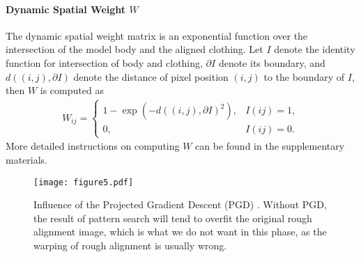 \documentclass[10pt,twocolumn,letterpaper]{article}
\begin{document}
\paragraph{Dynamic Spatial Weight $W$} The dynamic spatial weight matrix is an exponential function over the intersection of the model body and the aligned clothing. Let $I$ denote the identity function for intersection of body and clothing, $\partial I$ denote its boundary, and $d((i,j),\partial I)$ denote the distance of pixel position $(i,j)$ to the boundary of $I$, then $W$ is computed as \begin{gather}
    W_{ij}=\left\{\begin{array}{ll}
     1-\exp(-d((i,j),\partial I)^2),& I(ij)=1, \\
     0,& I(ij)=0.
\end{array}\right.\end{gather}
More detailed instructions on computing $W$ can be found in the supplementary materials.



\begin{figure}[t]
  \centering
  \texttt{[image: figure5.pdf]}\caption{Influence of the Projected Gradient Descent (PGD) \cite{madry2017towards}. Without PGD, the result of pattern search will tend to overfit the original rough alignment image, which is what we do not want in this phase, as the warping of rough alignment is usually wrong.}\label{fig: PGD-ablation}\end{figure}
\end{document}
